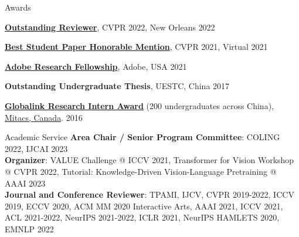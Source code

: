 \documentclass{resume} %
\begin{document}
\begin{rSection}{Awards}
\item {\textbf{\href{https://cvpr2022.thecvf.com/outstanding-reviewers}{Outstanding Reviewer}}, CVPR 2022, New Orleans } \hfill {2022}        
\item {\textbf{\href{http://cvpr2021.thecvf.com/node/329}{Best Student Paper Honorable Mention}}, CVPR 2021, Virtual } \hfill {2021}    
\item {\textbf{\href{https://research.adobe.com/fellowship/}{Adobe Research Fellowship}}, Adobe, USA} \hfill {2021}    
\item {\textbf{Outstanding Undergraduate Thesis}, UESTC, China} \hfill {2017} 
\item {\textbf{\href{https://www.mitacs.ca/en/programs/globalink/globalink-research-internship}{Globalink Research Intern Award}} (200 undergraduates across China), \href{https://www.mitacs.ca/en}{Mitacs, Canada}. } \hfill {2016}
\end{rSection}


\newpage



\begin{rSection}{Academic Service}
    \textbf{Area Chair / Senior Program Committee}: COLING 2022, IJCAI 2023  \\
    \textbf{Organizer}:  VALUE Challenge @ ICCV 2021, Transformer for Vision Workshop @ CVPR 2022, Tutorial: Knowledge-Driven Vision-Language Pretraining @ AAAI 2023 \\
    \textbf{Journal and Conference Reviewer}: TPAMI, IJCV, CVPR 2019-2022, ICCV 2019, ECCV 2020, ACM MM 2020 Interactive Arts, AAAI 2021, ICCV 2021, ACL 2021-2022, NeurIPS 2021-2022, ICLR 2021, NeurIPS HAMLETS 2020, EMNLP 2022
\end{rSection}



    
\end{document}
